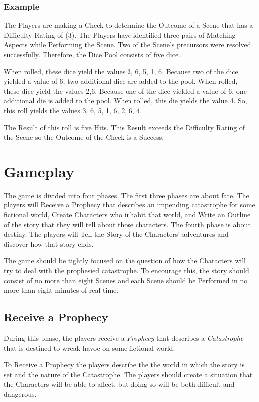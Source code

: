 \documentclass[12pt, a5paper, parskip=half-]{scrartcl}
\begin{document}
\newpage

\subsubsection*{Example}
The Players are making a Check to determine the Outcome of a Scene that has a Difficulty Rating of (3).
The Players have identified three pairs of Matching Aspects while Performing the Scene.
Two of the Scene's precursors were resolved successfully.
Therefore, the Dice Pool consists of five dice.

When rolled, these dice yield the values {3, 6, 5, 1, 6}.
Because two of the dice yielded a value of {6}, two additional dice are added to the pool.
When rolled, these dice yield the values {2,6}.
Because one of the dice yielded a value of {6}, one additional die is added to the pool.
When rolled, this die yields the value {4}.
So, this roll yields the values {3, 6, 5, 1, 6, 2, 6, 4}.

The Result of this roll is five Hits. This Result exceeds the Difficulty Rating of the Scene so the Outcome of the Check is a Success.   

\newpage

\section*{Gameplay}
The game is divided into four phases.
The first three phases are about fate.
The players will Receive a Prophecy that describes an impending catastrophe for some fictional world, Create Characters who inhabit that world, and Write an Outline of the story that they will tell about those characters.
The fourth phase is about destiny.
The players will Tell the Story of the Characters' adventures and discover how that story ends.

The game should be tightly focused on the question of how the Characters will try to deal with the prophesied catastrophe.
To encourage this, the story should consist of no more than eight Scenes and each Scene should be Performed in no more than eight minutes of real time. 

\subsection*{Receive a Prophecy}
During this phase, the players receive a \emph{Prophecy} that describes a \emph{Catastrophe} that is destined to wreak havoc on some fictional world.

To Receive a Prophecy the players describe the the world in which the story is set and the nature of the Catastrophe.
The players should create a situation that the Characters will be able to affect, but doing so will be both difficult and dangerous.
\end{document}
